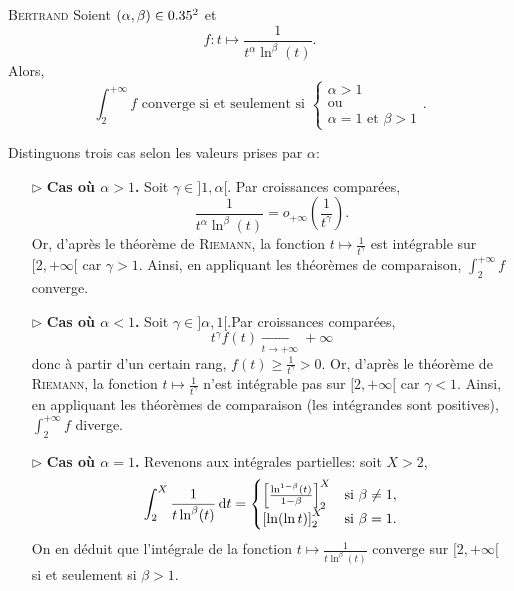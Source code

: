 \begin{theo}{\textsc{Bertrand}}
    Soient $(\alpha, \beta) \in  0.35^2$ et 
    $$f:t \mapsto \frac{1}{t^{\alpha} \ln^{\beta} (t)}.$$
    Alors,
    $$\int_{2}^{+ \infty} f \text{ converge si et seulement si }
    \begin{cases}
    \alpha > 1 \\
    \text{ou}\\
    \alpha = 1 \text{ et } \beta > 1
    \end{cases}.
    $$
\end{theo}

\begin{preuve}
    Distinguons trois cas selon les valeurs prises par $\alpha$:
    \begin{enumerate}
        \item[$\rhd$] \textbf{Cas où $\alpha > 1$.} Soit $\gamma \in ]1, \alpha[$. Par croissances comparées,
        $$\displaystyle \frac{1}{t^{\alpha} \ln^{\beta} (t)} = o_{+ \infty} \left( \frac{1}{t^{\gamma}} \right).$$
        Or, d'après le théorème de \textsc{Riemann}, la fonction $t \mapsto \frac{1}{t^\gamma}$ est intégrable sur $[2, +\infty[$ car $\gamma > 1$. Ainsi, en appliquant les théorèmes de comparaison, $\int_2^{+ \infty} f$ converge.
        \item[$\rhd$] \textbf{Cas où $\alpha < 1$.} Soit $\gamma \in ]\alpha, 1[$.Par croissances comparées,
        $$t^{\gamma} f(t) \xrightarrow[t \to + \infty]{} + \infty$$
        donc à partir d'un certain rang, $f(t) \geqslant \frac{1}{t^{\gamma}} > 0$. Or, d'après le théorème de \textsc{Riemann}, la fonction $t \mapsto \frac{1}{t^\gamma}$ n'est intégrable pas sur $[2, +\infty[$ car $\gamma < 1$. Ainsi, en appliquant les théorèmes de comparaison (les intégrandes sont positives), $\int_2^{+ \infty} f$ diverge.
        \item[$\rhd$] \textbf{Cas où $\alpha = 1$.} Revenons aux intégrales partielles: soit $X > 2$,
        $$\int_{2}^{X} \frac{1}{t \ln^{\beta} (t)} \, \mathrm{d} t = 
        \begin{cases}
            \left[ \frac{\ln ^{1-\beta} (t)}{1-\beta} \right]_2 ^X & \text{si } \beta \not = 1, \\
            \left[\ln (\ln t) \right]_2 ^X & \text{si } \beta = 1.
        \end{cases}
        $$
        On en déduit que l'intégrale de la fonction $t \mapsto \frac{1}{t \ln^{\beta} (t)}$ converge sur $[2, + \infty[$ si et seulement si $\beta > 1$.
    \end{enumerate}
\end{preuve}
